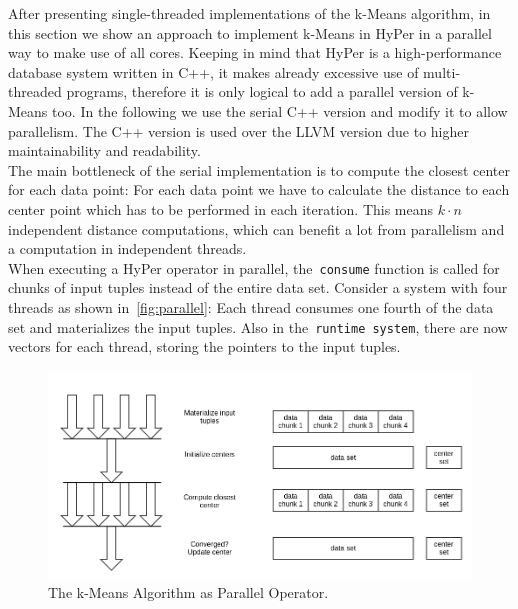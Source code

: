 After presenting single-threaded implementations of the k-Means algorithm, in this section we show an approach to implement k-Means in HyPer in a parallel way to make use of all cores. Keeping in mind that HyPer is a high-performance database system written in C++, it makes already excessive use of multi-threaded programs, therefore it is only logical to add a parallel version of k-Means too. In the following we use the serial C++ version and modify it to allow parallelism. The C++ version is used over the LLVM version due to higher maintainability and readability. 
\\
The main bottleneck of the serial implementation is to compute the closest center for each data point: For each data point we have to calculate the distance to each center point which has to be performed in each iteration. This means $k \cdot n$ independent distance computations, which can benefit a lot from parallelism and a computation in independent threads.
\\
When executing a HyPer operator in parallel, the~\texttt{consume} function is called for chunks of input tuples instead of the entire data set. Consider a system with four threads as shown in~\autoref{fig:parallel}: Each thread consumes one fourth of the data set and materializes the input tuples. Also in the~\texttt{runtime system}, there are now vectors for each thread, storing the pointers to the input tuples. 


\begin{figure}[htsb]
  \centerline{
    \includegraphics[scale=0.4]{figures/parallel_font}
  }
  \caption[The k-Means Algorithm as Parallel Operator]{The k-Means Algorithm as Parallel Operator.}
  \label{fig:parallel}
\end{figure}

